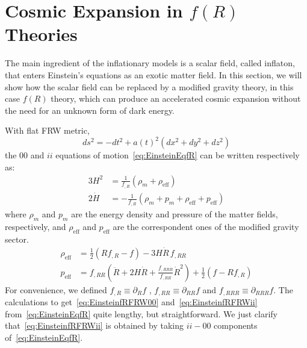\section{Cosmic Expansion in \texorpdfstring{$f(R)$}{f(R)} Theories}\label{sec:expansion}
The main ingredient of the inflationary models is a scalar field, called inflaton, that enters Einstein’s equations as an exotic matter field. In this section, we will show how the scalar field can be replaced by a modified gravity theory, in this case $f(R)$ theory, 
which can produce an accelerated cosmic expansion without the need for an unknown form of dark energy. 

With flat FRW metric, 
\begin{equation}
ds^{2} = -dt^{2} + a(t)^{2}\left(dx^{2} + dy^{2} + dz^{2}\right)
\end{equation}
the $00$ and $ii$  equations of motion~\eqref{eq:EinsteinEqfR} can be written respectively as:
\begin{align}
3H^{2} &= \frac{1}{f_{,R}}\left(\rho_{m} + \rho_{\mathrm{eff}}\right) \label{eq:EinsteinfRFRW00}\\[4pt] 
2\dot{H} &= -\frac{1}{f_{,R}}\left(\rho_{m} + p_{m} + \rho_{\mathrm{eff}} + p_{\mathrm{eff}}\right) \label{eq:EinsteinfRFRWii}
\end{align}
where $\rho_{m}$ and $p_{m}$ are the energy density and pressure of the matter fields, respectively, and $\rho_{\mathrm{eff}}$ and $p_{\mathrm{eff}}$ are the correspondent ones of the modified gravity sector.
\begin{align}
\rho_{\mathrm{eff}} &= \tfrac12\!\left(R f_{,R} - f\right) - 3H\dot{R}\,f_{,RR} \\[6pt]
p_{\mathrm{eff}} &= f_{,RR}\!\left(\ddot{R} + 2H\dot{R} + \frac{f_{,RRR}}{f_{,RR}}\dot{R}^{2}\right)
                  + \tfrac12\!\left(f - R f_{,R}\right)
\end{align}
For convenience, we defined $f_{,R}\equiv \partial_R f$ , $f_{,RR}\equiv \partial_{RR} f$ and $f_{,RRR}\equiv \partial_{RRR} f$.
The calculations to get~\eqref{eq:EinsteinfRFRW00} and~\eqref{eq:EinsteinfRFRWii} from~\eqref{eq:EinsteinEqfR} quite lengthy, but straightforward. We just clarify that~\eqref{eq:EinsteinfRFRWii} is obtained by taking $ii - 00$ components of~\eqref{eq:EinsteinEqfR}.

